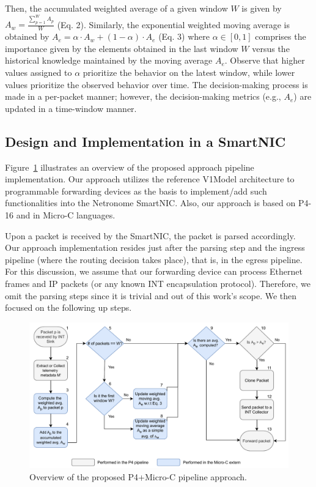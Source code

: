 Then, the accumulated weighted average of a given window $W$ is given by $A_w = \frac{\sum_{p = 1}^{W} A_p}{W}$ (Eq. 2). Similarly, the exponential weighted moving average is obtained by $A_e = \alpha \cdot A_w + (1 - \alpha) \cdot A_e$ (Eq. 3) where $\alpha \in [0,1]$ comprises the importance given by the elements obtained in the last window $W$ versus the historical knowledge maintained by the moving average $A_e$. Observe that higher values assigned to $\alpha$ prioritize the behavior on the latest window, while lower values prioritize the observed behavior over time. The decision-making process is made in a per-packet manner; however, the decision-making metrics (e.g., $A_e$) are updated in a time-window manner.


\subsection{Design and Implementation in a SmartNIC}


Figure~\ref{fig-overview} illustrates an overview of the proposed approach pipeline implementation. Our approach utilizes the reference V1Model architecture to programmable forwarding devices as the basis to implement/add such functionalities into the Netronome SmartNIC. Also, our approach is based on P4-16 and in Micro-C languages. 

Upon a packet is received by the SmartNIC, the packet is parsed accordingly. Our approach implementation resides just after the parsing step and the ingress pipeline (where the routing decision takes place), that is, in the egress pipeline. For this discussion, we assume that our forwarding device can process Ethernet frames and IP packets (or any known INT encapsulation protocol). Therefore, we omit the parsing steps since it is trivial and out of this work's scope. We then focused on the following up steps.   

\begin{figure}[t]
\centering
        \includegraphics[scale=0.45]{aina-img/apf-overview.pdf}
        \caption{Overview of the proposed P4+Micro-C pipeline approach.}
        \label{fig-overview}
\end{figure}

